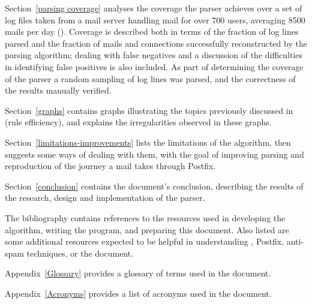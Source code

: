 Section~\ref{parsing coverage} analyses the coverage the parser achieves
over a set of \numberOFlogFILES{} log files taken from a mail server
handling mail for over 700 users, averaging 8500 mails per day
().  Coverage is described both
in terms of the fraction of log lines parsed and the fraction of mails and
connections successfully reconstructed by the parsing algorithm; dealing
with false negatives and a discussion of the difficulties in identifying
false positives is also included.  As part of determining the coverage of
the parser a random sampling of log lines was parsed, and the correctness
of the results manually verified.

Section~\ref{graphs} contains graphs illustrating the topics previously
discussed in  (rule efficiency), and explains
the irregularities observed in these graphs.

Section~\ref{limitations-improvements} lists the limitations of the
algorithm, then suggests some ways of dealing with them, with the goal of
improving parsing and reproduction of the journey a mail takes through
Postfix.

Section~\ref{conclusion} contains the document's conclusion, describing the
results of the research, design and implementation of the parser.

The bibliography contains references to the resources used in developing
the algorithm, writing the program, and preparing this document.  Also
listed are some additional resources expected to be helpful in
understanding \SMTP{}, Postfix, anti-spam techniques, or the document.

Appendix~\ref{Glossary} provides a glossary of terms used in the document.

Appendix~\ref{Acronyms} provides a list of acronyms used in the document.

